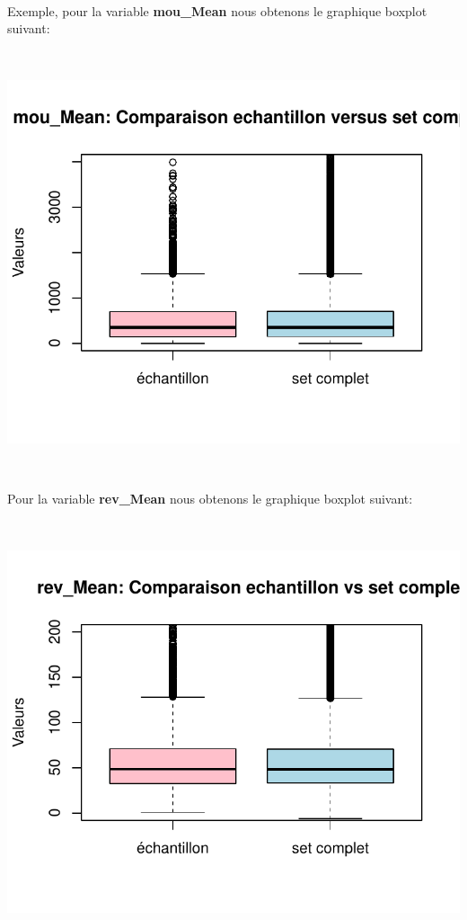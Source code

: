 \documentclass[]{imsart}
\numberwithin{equation}{section}
\theoremstyle{plain}
\begin{document}
~

Exemple, pour la variable \textbf{mou\_Mean} nous obtenons le graphique boxplot suivant:

~

\begin{flushleft}\includegraphics{Analyse_Exploratoire_Projet_files/figure-latex/unnamed-chunk-8-1} \end{flushleft}

~

Pour la variable \textbf{rev\_Mean} nous obtenons le graphique boxplot suivant:

~

\begin{flushleft}\includegraphics{Analyse_Exploratoire_Projet_files/figure-latex/unnamed-chunk-9-1} \end{flushleft}
\end{document}
